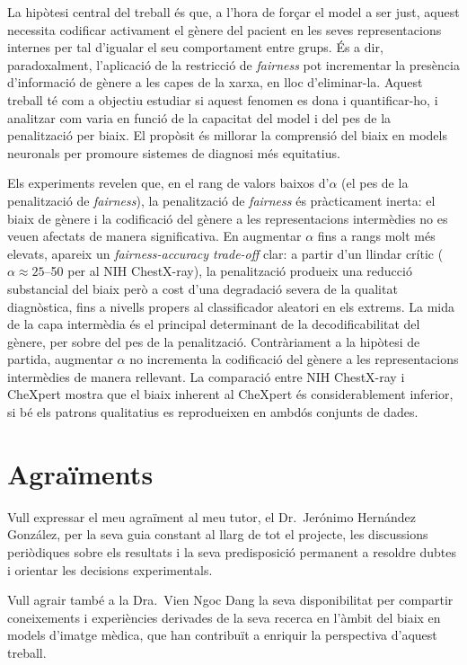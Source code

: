 \documentclass[a4paper,12pt,twoside]{ThesisStyle}
\begin{document}
La hipòtesi central del treball és que, a l'hora de forçar el model a ser just, aquest necessita codificar activament el gènere del pacient en les seves representacions internes per tal d'igualar el seu comportament entre grups. És a dir, paradoxalment, l'aplicació de la restricció de \textit{fairness} pot incrementar la presència d'informació de gènere a les capes de la xarxa, en lloc d'eliminar-la. Aquest treball té com a objectiu estudiar si aquest fenomen es dona i quantificar-ho, i analitzar com varia en funció de la capacitat del model i del pes de la penalització per biaix. El propòsit és millorar la comprensió del biaix en models neuronals per promoure sistemes de diagnosi més equitatius.

Els experiments revelen que, en el rang de valors baixos d'$\alpha$ (el pes de la penalització de \textit{fairness}), la penalització de \textit{fairness} és pràcticament inerta: el biaix de gènere i la codificació del gènere a les representacions intermèdies no es veuen afectats de manera significativa. En augmentar $\alpha$ fins a rangs molt més elevats, apareix un \textit{fairness-accuracy trade-off} clar: a partir d'un llindar crític ($\alpha \approx 25$--50 per al NIH ChestX-ray), la penalització produeix una reducció substancial del biaix però a cost d'una degradació severa de la qualitat diagnòstica, fins a nivells propers al classificador aleatori en els extrems. La mida de la capa intermèdia és el principal determinant de la decodificabilitat del gènere, per sobre del pes de la penalització. Contràriament a la hipòtesi de partida, augmentar $\alpha$ no incrementa la codificació del gènere a les representacions intermèdies de manera rellevant. La comparació entre NIH ChestX-ray i CheXpert mostra que el biaix inherent al CheXpert és considerablement inferior, si bé els patrons qualitatius es reprodueixen en ambdós conjunts de dades.


\chapter*{Agraïments}
\label{cap:agraiments}

Vull expressar el meu agraïment al meu tutor, el Dr.\ Jerónimo Hernández González, per la seva guia constant al llarg de tot el projecte, les discussions periòdiques sobre els resultats i la seva predisposició permanent a resoldre dubtes i orientar les decisions experimentals.

Vull agrair també a la Dra.\ Vien Ngoc Dang la seva disponibilitat per compartir coneixements i experiències derivades de la seva recerca en l'àmbit del biaix en models d'imatge mèdica, que han contribuït a enriquir la perspectiva d'aquest treball.
\end{document}
